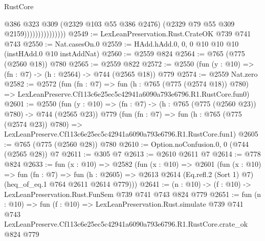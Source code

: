 \begin{lexlean}{RustCore}
\begin{coremodule}
                                @386
                                @323
                                @309
                                (@2329 @103 @55 @386 @2476)
                                (@2329 @79 @55 @309 @2159)))))))))))))))
@2549 := LexLeanPreservation.Rust.CrateOK @739 @741 @743
@2550 := Nat.casesOn.{0}
@2559 := HAdd.hAdd.{0, 0, 0} @10 @10 @10 (instHAdd.{0} @10 instAddNat)
@2560 := @2559 @824
@2564 := @765 (@775 (@2560 @18)) @780
@2565 := @2559 @822
@2572 := @2550 (fun (y : @10) => (fn : @7) -> (h : @2564) -> @744 (@2565 @18)) @779
@2574 := @2559 Nat.zero
@2582 := @2572
    (fun (fn : @7) =>
    fun (h : @765 (@775 (@2574 @18)) @780) =>
    LexLeanPreserve.Cf113c6e25ec5c42941a6090a793e6796.R1.RustCore.fun0)
@2601 := @2550
    (fun (y : @10) => (fn : @7) -> (h : @765 (@775 (@2560 @23)) @780) -> @744 (@2565 @23))
    @779
    (fun (fn : @7) =>
    fun (h : @765 (@775 (@2574 @23)) @780) =>
    LexLeanPreserve.Cf113c6e25ec5c42941a6090a793e6796.R1.RustCore.fun1)
@2605 := @765 (@775 (@2560 @28)) @780
@2610 := Option.noConfusion.{0, 0} (@744 (@2565 @28)) @7
@2611 := @305 @7
@2613 := @2610 @2611 @7
@2614 := @778 @824
@2633 := fun (x : @10) =>
  @2582
    (fun (x : @10) =>
    @2601
      (fun (x : @10) =>
      fun (fn : @7) =>
      fun (h : @2605) =>
      @2613 @2614 (Eq.refl.{2} (Sort 1) @7) (heq_of_eq.{1} @764 @2611 @2614 @779)))
@2641 := (n : @10) -> (f : @10) -> LexLeanPreservation.Rust.FunSem @739 @741 @743 @824 @779
@2651 := fun (n : @10) =>
  fun (f : @10) =>
  LexLeanPreservation.Rust.simulate
    @739
    @741
    @743
    LexLeanPreserve.Cf113c6e25ec5c42941a6090a793e6796.R1.RustCore.crate_ok
    @824
    @779
\end{coremodule}
\end{lexlean}
